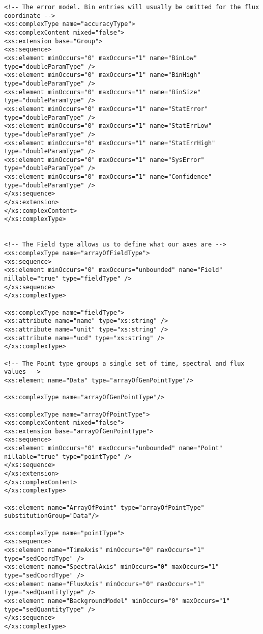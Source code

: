 {\begin{flushleft}
\begin{fmppage}
\begin{verbatim}
<!-- The error model. Bin entries will usually be omitted for the flux coordinate -->
<xs:complexType name="accuracyType">
<xs:complexContent mixed="false">
<xs:extension base="Group">
<xs:sequence>
<xs:element minOccurs="0" maxOccurs="1" name="BinLow" type="doubleParamType" />
<xs:element minOccurs="0" maxOccurs="1" name="BinHigh" type="doubleParamType" />
<xs:element minOccurs="0" maxOccurs="1" name="BinSize" type="doubleParamType" />
<xs:element minOccurs="0" maxOccurs="1" name="StatError" type="doubleParamType" />
<xs:element minOccurs="0" maxOccurs="1" name="StatErrLow" type="doubleParamType" />
<xs:element minOccurs="0" maxOccurs="1" name="StatErrHigh" type="doubleParamType" />
<xs:element minOccurs="0" maxOccurs="1" name="SysError" type="doubleParamType" />
<xs:element minOccurs="0" maxOccurs="1" name="Confidence" type="doubleParamType" />
</xs:sequence>
</xs:extension>
</xs:complexContent>
</xs:complexType>


<!-- The Field type allows us to define what our axes are -->
<xs:complexType name="arrayOfFieldType">
<xs:sequence>
<xs:element minOccurs="0" maxOccurs="unbounded" name="Field" nillable="true" type="fieldType" />
</xs:sequence>
</xs:complexType>

<xs:complexType name="fieldType">
<xs:attribute name="name" type="xs:string" />
<xs:attribute name="unit" type="xs:string" />
<xs:attribute name="ucd" type="xs:string" />
</xs:complexType>

<!-- The Point type groups a single set of time, spectral and flux values -->
<xs:element name="Data" type="arrayOfGenPointType"/>

<xs:complexType name="arrayOfGenPointType"/>

<xs:complexType name="arrayOfPointType">
<xs:complexContent mixed="false">
<xs:extension base="arrayOfGenPointType">
<xs:sequence>
<xs:element minOccurs="0" maxOccurs="unbounded" name="Point" nillable="true" type="pointType" />
</xs:sequence>
</xs:extension>
</xs:complexContent>
</xs:complexType>

<xs:element name="ArrayOfPoint" type="arrayOfPointType" substitutionGroup="Data"/>

<xs:complexType name="pointType">
<xs:sequence>
<xs:element name="TimeAxis" minOccurs="0" maxOccurs="1" type="sedCoordType" />
<xs:element name="SpectralAxis" minOccurs="0" maxOccurs="1" type="sedCoordType" />
<xs:element name="FluxAxis" minOccurs="0" maxOccurs="1" type="sedQuantityType" />
<xs:element name="BackgroundModel" minOccurs="0" maxOccurs="1" type="sedQuantityType" />
</xs:sequence>
</xs:complexType>


\end{verbatim}
\end{fmppage}
\end{flushleft}}
